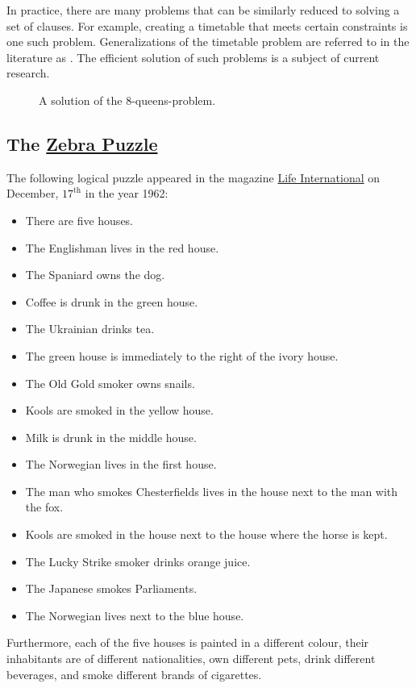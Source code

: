 In practice, there are many problems that can be similarly reduced to solving a
set of clauses. For example, creating a timetable that meets certain constraints is one such problem. Generalizations of the
timetable problem are referred to in the literature as .
The efficient solution of such problems is a subject of current research.

\begin{figure}[!ht]
  \centering
  \caption{A solution of the 8-queens-problem.}
  \label{fig:8-queens.pdf}
\end{figure}
\FloatBarrier
\pagebreak

\subsection{The \href{https://en.wikipedia.org/wiki/Zebra_Puzzle}{Zebra Puzzle} \label{section:zebra}} 
The following logical puzzle appeared in the magazine
\href{https://en.wikipedia.org/wiki/Life_(magazine)}{Life International} 
on  December, $17^\textrm{th}$  in the year 1962:
\begin{itemize}
\item There are five houses.
\item The Englishman lives in the red house.
\item The Spaniard owns the dog.
\item Coffee is drunk in the green house.
\item The Ukrainian drinks tea.
\item The green house is immediately to the right of the ivory house.
\item The Old Gold smoker owns snails.
\item Kools are smoked in the yellow house.
\item Milk is drunk in the middle house.
\item The Norwegian lives in the first house.
\item The man who smokes Chesterfields lives in the house next to the man with the fox.
\item Kools are smoked in the house next to the house where the horse is kept.
\item The Lucky Strike smoker drinks orange juice.
\item The Japanese smokes Parliaments.
\item The Norwegian lives next to the blue house.
\end{itemize}
Furthermore, each of the five houses is painted in a different colour, their
inhabitants are of different nationalities, own different pets, drink different
beverages, and smoke different brands of cigarettes.  

